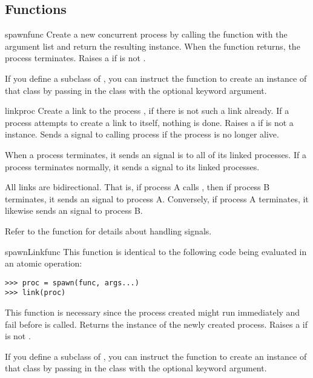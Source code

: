 \documentclass{howto}
\begin{document}
\subsection{Functions}

\begin{funcdesc}{spawn}{func}
Create a new concurrent process by calling the function  with the
 argument list and return the resulting  instance.
When the function  returns, the process terminates. Raises a
  if  is not
.

If you define a subclass of , you can instruct the
 function to create an instance of that class by passing in
the class with the optional  keyword argument.
\end{funcdesc}

\begin{funcdesc}{link}{proc}
Create a link to the process , if there is not such a link already. If
a process attempts to create a link to itself, nothing is done. Raises a
  if  is not a 
instance. Sends a   signal to calling process if the
 process is no longer alive.

When a process terminates, it sends an  signal is to all of its
linked processes. If a process terminates normally, it sends a 
 signal to its linked processes.

All links are bidirectional. That is, if process A calls , then if
process B terminates, it sends an  signal to process A. Conversely,
if process A terminates, it likewise sends an  signal to process B.

Refer to the  function for details about handling
signals.
\end{funcdesc}

\begin{funcdesc}{spawnLink}{func}
This function is identical to the following code being evaluated in an atomic
operation:
\begin{verbatim}
>>> proc = spawn(func, args...)
>>> link(proc)
\end{verbatim}
This function is necessary since the process created might run immediately and
fail before  is called. Returns the  instance of
the newly created process. Raises a   if
 is not .

If you define a subclass of , you can instruct the
 function to create an instance of that class by passing
in the class with the optional  keyword argument.
\end{funcdesc}
\end{document}
